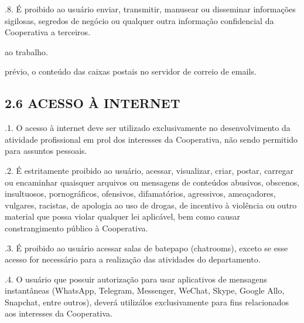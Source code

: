 \documentclass[letterpaper,10pt,brazil]{sphinxmanual}
\begin{document}
.8. É proibido ao usuário enviar, transmitir, manusear ou disseminar informações sigilosas, segredos de negócio
ou qualquer outra informação confidencial da Cooperativa a terceiros.
\begin{description}
\begin{description}
\sphinxAtStartPar
ao trabalho.

\end{description}

\sphinxAtStartPar
prévio, o conteúdo das caixas postais no servidor de correio de e\sphinxhyphen{}mails.

\end{description}


\subsection{2.6 ACESSO À INTERNET}
\label{\detokenize{regras:id6}}
.1. O acesso à internet deve ser utilizado exclusivamente no desenvolvimento da atividade profissional em prol dos interesses da Cooperativa, não sendo permitido para assuntos pessoais.

.2. É estritamente proibido ao usuário, acessar, visualizar, criar, postar, carregar ou encaminhar quaisquer arquivos ou mensagens de conteúdos abusivos, obscenos, insultuosos, pornográficos, ofensivos, difamatórios, agressivos, ameaçadores, vulgares, racistas, de apologia ao uso de drogas, de incentivo à violência ou outro material que possa violar qualquer lei aplicável, bem como causar constrangimento público à Cooperativa.

.3. É proibido ao usuário acessar salas de bate\sphinxhyphen{}papo (chatrooms), exceto se esse acesso for necessário para a realização das atividades do departamento.

.4. O usuário que possuir autorização para usar aplicativos de mensagens instantâneas (WhatsApp, Telegram, Messenger, WeChat, Skype, Google Allo, Snapchat, entre outros), deverá utilizá\sphinxhyphen{}los exclusivamente para fins relacionados aos interesses da Cooperativa.
\end{document}
